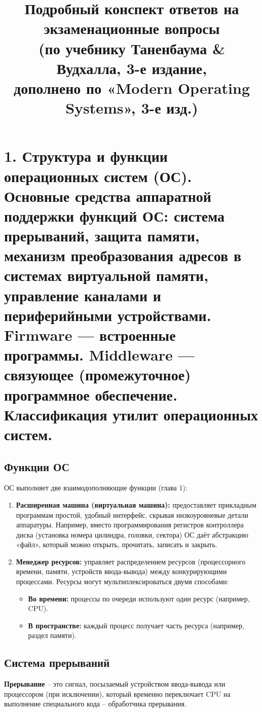 \documentclass[a4paper,12pt]{article}
\title{Подробный конспект ответов на экзаменационные вопросы\\
(по учебнику Таненбаума \& Вудхалла, 3-е издание,\\
дополнено по «Modern Operating Systems», 3-е изд.)}
\date{}
\begin{document}
\maketitle

\section*{1. Структура и функции операционных систем (ОС). Основные средства аппаратной поддержки функций ОС: система прерываний, защита памяти, механизм преобразования адресов в системах виртуальной памяти, управление каналами и периферийными устройствами. Firmware — встроенные программы. Middleware — связующее (промежуточное) программное обеспечение. Классификация утилит операционных систем.}

\subsection{Функции ОС}
ОС выполняет две взаимодополняющие функции (глава 1):
\begin{enumerate}
    \item \textbf{Расширенная машина (виртуальная машина):} предоставляет прикладным программам простой, удобный интерфейс, скрывая низкоуровневые детали аппаратуры. Например, вместо программирования регистров контроллера диска (установка номера цилиндра, головки, сектора) ОС даёт абстракцию «файл», который можно открыть, прочитать, записать и закрыть.
    \item \textbf{Менеджер ресурсов:} управляет распределением ресурсов (процессорного времени, памяти, устройств ввода-вывода) между конкурирующими процессами. Ресурсы могут мультиплексироваться двумя способами: 
    \begin{itemize}
        \item \textbf{Во времени:} процессы по очереди используют один ресурс (например, CPU).
        \item \textbf{В пространстве:} каждый процесс получает часть ресурса (например, раздел памяти).
    \end{itemize}
\end{enumerate}

\subsection{Система прерываний}
\textbf{Прерывание} – это сигнал, посылаемый устройством ввода-вывода или процессором (при исключении), который временно переключает CPU на выполнение специального кода – обработчика прерывания.
\end{document}
